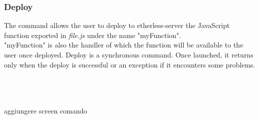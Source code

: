 \subsubsection{Deploy}
The command allows the user to deploy to etherless-server the JavaScript function exported in \textit{file.js} under the name "myFunction".\\ 
"myFunction" is also the handler of which the function will be available to the user once deployed. Deploy is a synchronous command. Once launched, it returns only when the deploy is successful or an exception if it encounters some problems.\\
\\
\centerline{}\\
\\
aggiungere screen comando




